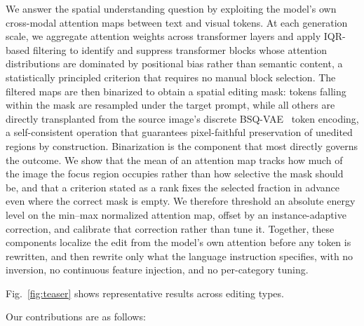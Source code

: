 We answer the spatial understanding question by exploiting the model's own cross-modal attention maps between text and visual tokens. At each generation scale, we aggregate attention weights across transformer layers and apply IQR-based filtering to identify and suppress transformer blocks whose attention distributions are dominated by positional bias rather than semantic content, a statistically principled criterion that requires no manual block selection. The filtered maps are then binarized to obtain a spatial editing mask: tokens falling within the mask are resampled under the target prompt, while all others are directly transplanted from the source image's discrete BSQ-VAE~\cite{BSQVAE} token encoding, a self-consistent operation that guarantees pixel-faithful preservation of unedited regions by construction. Binarization is the component that most directly governs the outcome. We show that the mean of an attention map tracks how much of the image the focus region occupies rather than how selective the mask should be, and that a criterion stated as a rank fixes the selected fraction in advance even where the correct mask is empty. We therefore threshold an absolute energy level on the min--max normalized attention map, offset by an instance-adaptive correction, and calibrate that correction rather than tune it. Together, these components localize the edit from the model's own attention before any token is rewritten, and then rewrite only what the language instruction specifies, with no inversion, no continuous feature injection, and no per-category tuning.

Fig.~\ref{fig:teaser} shows representative results across editing types.

Our contributions are as follows:

